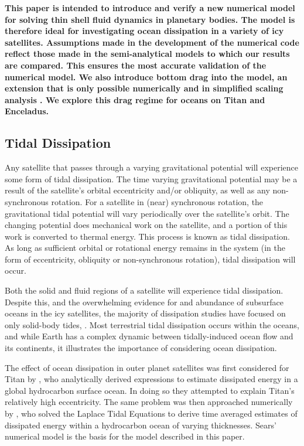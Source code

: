 \textbf{This paper is intended to introduce and verify a new numerical model for solving thin shell fluid dynamics in planetary bodies. The model is therefore ideal for investigating ocean dissipation in a variety of icy satellites. Assumptions made in the development of the numerical code reflect those made in the semi-analytical models to which our results are compared. This ensures the most accurate validation of the numerical model. We also introduce bottom drag into the model, an extension that is only possible numerically and in simplified scaling analysis \citep{chen2013tidal}. We explore this drag regime for oceans on Titan and Enceladus.}

\subsection{Tidal Dissipation}

Any satellite that passes through a varying gravitational potential will experience some form of tidal dissipation. The time varying gravitational potential may be a result of the satellite's orbital eccentricity and/or obliquity, as well as any non-synchronous rotation. For a satellite in (near) synchronous rotation, the gravitational tidal potential will vary periodically over the satellite's orbit. The changing potential does mechanical work on the satellite, and a portion of this work is converted to thermal energy. This process is known as tidal dissipation. As long as sufficient orbital or rotational energy remains in the system (in the form of eccentricity, obliquity or non-synchronous rotation), tidal dissipation will occur.

Both the solid and fluid regions of a satellite will experience tidal dissipation. Despite this, and the overwhelming evidence for and abundance of subsurface oceans in the icy satellites, the majority of dissipation studies have focused on only solid-body tides, \citep[e.g.,][]{moore2000tidal, tobie2005tidal,roberts2008tidal, beuthe2013spatial}.
Most terrestrial tidal dissipation occurs within the oceans, and while Earth has a complex dynamic between tidally-induced ocean flow and its continents, it illustrates the importance of considering ocean dissipation.

The effect of ocean dissipation in outer planet satellites was first considered for Titan by \citet{sagan1982tide}, who analytically derived expressions to estimate dissipated energy in a global hydrocarbon surface ocean. In doing so they attempted to explain Titan's relatively high eccentricity. The same problem was then approached numerically by \citet{sears1995tidal}, who solved the Laplace Tidal Equations to derive time averaged estimates of dissipated energy within a hydrocarbon ocean of varying thicknesses. Sears' numerical model is the basis for the model described in this paper.

